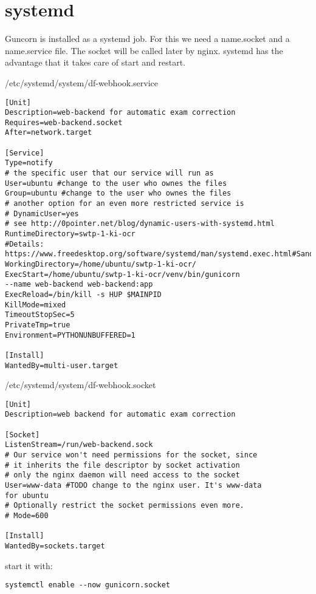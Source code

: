 \section{systemd}
Guncorn is installed as a systemd job. For this we need a
name.socket and a name.service file. The socket will be
called later by nginx.
systemd has the advantage that it takes care of start and
restart.

/etc/systemd/system/df-webhook.service
\begin{verbatim}
[Unit]
Description=web-backend for automatic exam correction
Requires=web-backend.socket
After=network.target

[Service]
Type=notify
# the specific user that our service will run as
User=ubuntu #change to the user who ownes the files
Group=ubuntu #change to the user who ownes the files
# another option for an even more restricted service is
# DynamicUser=yes
# see http://0pointer.net/blog/dynamic-users-with-systemd.html
RuntimeDirectory=swtp-1-ki-ocr
#Details: https://www.freedesktop.org/software/systemd/man/systemd.exec.html#Sandboxing
WorkingDirectory=/home/ubuntu/swtp-1-ki-ocr/
ExecStart=/home/ubuntu/swtp-1-ki-ocr/venv/bin/gunicorn
--name web-backend web-backend:app
ExecReload=/bin/kill -s HUP $MAINPID
KillMode=mixed
TimeoutStopSec=5
PrivateTmp=true
Environment=PYTHONUNBUFFERED=1

[Install]
WantedBy=multi-user.target
\end{verbatim}
/etc/systemd/system/df-webhook.socket
\begin{verbatim}
[Unit]
Description=web backend for automatic exam correction

[Socket]
ListenStream=/run/web-backend.sock
# Our service won't need permissions for the socket, since
# it inherits the file descriptor by socket activation
# only the nginx daemon will need access to the socket
User=www-data #TODO change to the nginx user. It's www-data
for ubuntu
# Optionally restrict the socket permissions even more.
# Mode=600

[Install]
WantedBy=sockets.target
\end{verbatim}

start it with:
\begin{verbatim}
systemctl enable --now gunicorn.socket
\end{verbatim}


